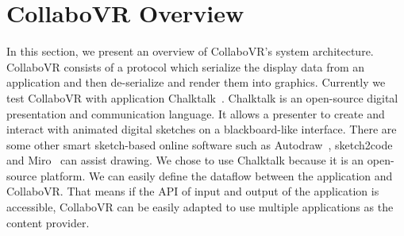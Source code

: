 \documentclass{sigchi}
\begin{document}

\section{CollaboVR Overview}
In this section, we present an overview of CollaboVR's system architecture. CollaboVR consists of a protocol which serialize the display data from an application and then de-serialize and render them into graphics. Currently we test CollaboVR with application Chalktalk~\cite{perlin2018chalktalk}. Chalktalk is an open-source digital presentation and communication language. It allows a presenter to create and interact with animated digital sketches on a blackboard-like interface. There are some other smart sketch-based online software such as Autodraw~\cite{Autodraw}, sketch2code~\cite{Sketch2code} and Miro~\cite{Miro} can assist drawing. We chose to use Chalktalk because it is an open-source platform. We can easily define the dataflow between the application and CollaboVR. That means if the API of input and output of the application is accessible, CollaboVR can be easily adapted to use multiple applications as the content provider.
\end{document}
